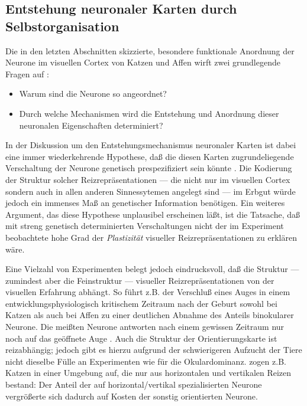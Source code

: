 \subsection{Entstehung neuronaler Karten durch Selbstorganisation}
\label{plastizitaet}

Die in den letzten Abschnitten skizzierte, besondere funktionale Anordnung
der Neurone im visuellen Cortex von Katzen und Affen wirft zwei
grundlegende Fragen auf \cite{marlsburg:1973}:

\begin{itemize}
\item Warum sind die Neurone so angeordnet?
\item Durch welche Mechanismen wird die Entstehung und Anordnung dieser
neuronalen Eigenschaften determiniert?
\end{itemize}

In der Diskussion um den Entstehungsmechanismus neuronaler Karten ist dabei
eine immer wiederkehrende Hypothese, daß die diesen Karten
zugrundeliegende Verschaltung der Neurone genetisch prespezifiziert sein
könnte . Die Kodierung der
Struktur solcher Reizrepräsentationen --- die nicht nur im visuellen
Cortex sondern auch in allen anderen Sinnessytemen angelegt sind --- im
Erbgut würde jedoch ein immenses Maß an genetischer Information
benötigen.  Ein weiteres Argument, das diese Hypothese unplausibel
erscheinen läßt, ist die Tatsache, daß mit streng genetisch
determinierten Verschaltungen nicht der im Experiment beobachtete hohe Grad
der \emph{Plastizität} visueller Reizrepräsentationen zu erklären wäre.

Eine Vielzahl von Experimenten belegt jedoch eindrucksvoll, daß die
Struktur --- zumindest aber die Feinstruktur --- visueller
Reizrepräsentationen von der visuellen Erfahrung abhängt. So führt
z.B. der Verschluß eines Auges in einem entwicklungsphysiologisch
kritischem Zeitraum nach der Geburt sowohl bei Katzen als auch bei Affen zu
einer deutlichen Abnahme des Anteils binokularer Neurone. Die meißten
Neurone antworten nach einem gewissen Zeitraum nur noch auf das geöffnete
Auge . Auch die Struktur der
Orientierungskarte ist reizabhängig; jedoch gibt es hierzu aufgrund der
schwierigeren Aufzucht der Tiere nicht dieselbe Fülle an Experimenten wie
für die Okulardominanz.  zogen z.B. Katzen in
einer Umgebung auf, die nur aus horizontalen und vertikalen Reizen bestand:
Der Anteil der auf horizontal/vertikal spezialisierten Neurone
vergrößerte sich dadurch auf Kosten der sonstig orientierten Neurone.


